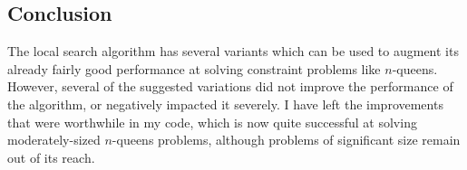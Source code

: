 \documentclass{article}
\begin{document}
\begin{doublespace}
\section{Conclusion}
The local search algorithm has several variants which can be used to augment its already fairly good performance at solving constraint problems like $n$-queens. However, several of the suggested variations did not improve the performance of the algorithm, or negatively impacted it severely. I have left the improvements that were worthwhile in my code, which is now quite successful at solving moderately-sized $n$-queens problems, although problems of significant size remain out of its reach.




\end{doublespace}
\end{document}
